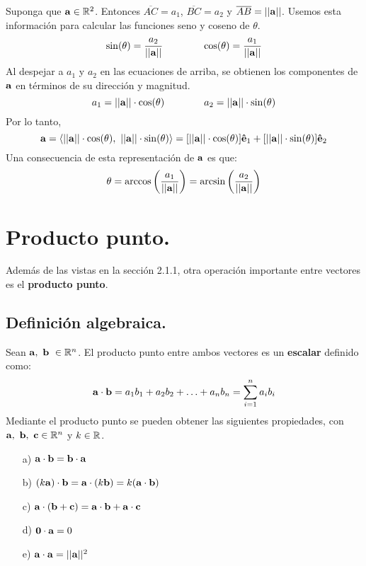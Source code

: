 \documentclass[12pt]{article}
\begin{document}
Suponga que $\mathbf{a} \in \mathbb{R}^{2}$. Entonces $\overline{AC} = a_{1}$, $\overline{BC} = a_{2}$ y $\overline{AB} = ||\mathbf{a}||$. Usemos esta información para calcular las funciones seno y coseno de $\theta$.
\[
  \sin(\theta) = \frac{a_{2}}{||\mathbf{a}||} \qquad \qquad \cos(\theta) = \frac{a_{1}}{||\mathbf{a}||}
\]
Al despejar a $a_{1}$ y $a_{2}$ en las ecuaciones de arriba, se obtienen los componentes de $\mathbf{a}$ en términos de su dirección y magnitud.
\[
  a_{1} = ||\mathbf{a}|| \cdot \cos(\theta) \qquad \qquad a_{2} = ||\mathbf{a}|| \cdot \sin(\theta)
\]
Por lo tanto,
\[
  \mathbf{a} = \langle ||\mathbf{a}|| \cdot \cos(\theta), \ ||\mathbf{a}|| \cdot \sin(\theta) \rangle
             = [||\mathbf{a}|| \cdot \cos(\theta)] \mathbf{\hat{e}}_{1} + [||\mathbf{a}|| \cdot \sin(\theta)] \mathbf{\hat{e}}_{2}
\]
Una consecuencia de esta representación de $\mathbf{a}$ es que:
\[
  \theta = \arccos\left(\frac{a_{1}}{||\mathbf{a}||}\right) = \arcsin\left(\frac{a_{2}}{||\mathbf{a}||}\right)
\]


\section{Producto punto.}

Además de las vistas en la sección 2.1.1, otra operación importante entre vectores es el \textbf{producto punto}.

\subsection{Definición algebraica.}

Sean $\mathbf{a}, \ \mathbf{b} \ \in \mathbb{R}^{n}$. El producto punto entre ambos vectores es un \textbf{escalar} definido como:
\[
  \mathbf{a} \cdot \mathbf{b} = a_{1} b_{1} + a_{2} b_{2} + \ldots + a_{n} b_{n} = \sum_{i = 1}^{n} a_{i} b_{i}
\]
Mediante el producto punto se pueden obtener las siguientes propiedades, con $\mathbf{a}, \ \mathbf{b}, \ \mathbf{c} \in \mathbb{R}^{n}$ y $k \in \mathbb{R}$.

\begin{itemize}
\item[a)] $\mathbf{a} \cdot \mathbf{b} = \mathbf{b} \cdot \mathbf{a}$
\item[b)] $(k \mathbf{a}) \cdot \mathbf{b} = \mathbf{a} \cdot (k \mathbf{b}) = k (\mathbf{a} \cdot \mathbf{b})$
\item[c)] $\mathbf{a} \cdot (\mathbf{b} + \mathbf{c}) = \mathbf{a} \cdot \mathbf{b} + \mathbf{a} \cdot \mathbf{c}$
\item[d)] $\mathbf{0} \cdot \mathbf{a} = 0$
\item[e)] $\mathbf{a} \cdot \mathbf{a} = ||\mathbf{a}||^{2}$
\end{itemize}
\end{document}
